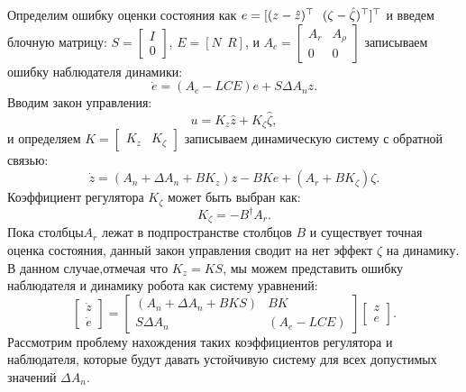 Определим ошибку оценки состояния как $e = [ (z-\hat{z})^\top \ \ (\zeta-\hat{\zeta})^\top ]^\top$ и введем блочную матрицу:
${S} = \begin{bmatrix}
	{I} \\ 0
\end{bmatrix}$, 
${E}=[ {N} \ \ {R}]$, и 
$
{A}_c=    \begin{bmatrix}
	{A}_r  & {A}_{\rho} \\
	0  & 0
\end{bmatrix}
$
записываем ошибку наблюдателя динамики:
%
\begin{equation}
	\label{eq:part1_error_dynamics}
	\dot e= ({A}_e-{L}{C}{E})e +{S}\Delta {A}_n z.
\end{equation}
%
Вводим закон управления:
%
\begin{equation}
	u={K}_z \hat{z}+{K}_{\zeta} \hat{\zeta},
\end{equation}
%
и определяем ${K}=\begin{bmatrix}
	{K}_z & {K}_{\zeta}
\end{bmatrix}$ записываем динамическую систему с обратной связью:
%
\begin{equation}
	\label{eq:part1_active_dynamics}
	\dot{z}=({A}_n+\Delta {A}_n +{B}{K}_z)z-{B}{K}e+({A}_r+{B}{K}_{\zeta})\zeta.
\end{equation}
%
Коэффициент регулятора ${K}_{\zeta}$ может быть выбран как:
%
\begin{equation}
	\label{eq:part1_static_control}
	{K}_{\zeta}=-{B}^{\dagger}{A}_r.
\end{equation}
%
Пока столбцы${A}_r$ лежат в подпространстве столбцов ${B}$ и существует точная оценка состояния, данный закон управления сводит на нет эффект $\zeta$ на динамику. В данном случае,отмечая что ${K}_z={K}{S}$,  мы можем представить ошибку наблюдателя и динамику робота как систему уравнений:
%
\begin{equation}
	\label{eq:part1_system}
	\begin{bmatrix}
		\dot{z} \\ \dot{e}
	\end{bmatrix}=\begin{bmatrix}
		({A}_n+\Delta {A}_n +{B}{K}{S}) & {B}{K} \\
		{S} \Delta {A}_n & ({A}_e-{L}{C}{E})        \end{bmatrix}\begin{bmatrix}
		z \\ e
	\end{bmatrix}.
\end{equation}
%
Рассмотрим проблему нахождения таких коэффициентов регулятора и наблюдателя, которые будут давать устойчивую систему для всех допустимых значений $\Delta {A}_n$.

